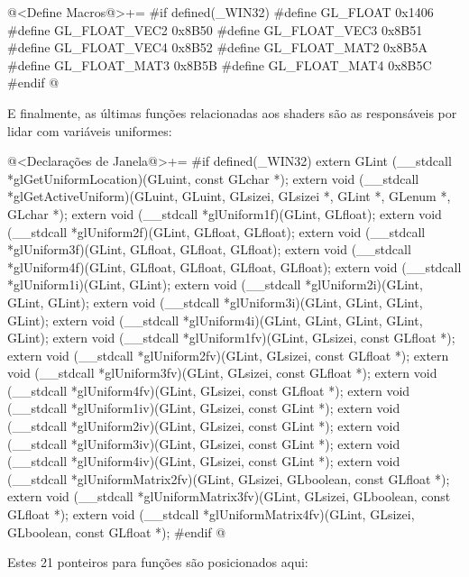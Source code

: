 \iniciocodigo
@<Define Macros@>+=
#if defined(_WIN32)
#define GL_FLOAT      0x1406
#define GL_FLOAT_VEC2 0x8B50
#define GL_FLOAT_VEC3 0x8B51
#define GL_FLOAT_VEC4 0x8B52
#define GL_FLOAT_MAT2 0x8B5A
#define GL_FLOAT_MAT3 0x8B5B
#define GL_FLOAT_MAT4 0x8B5C
#endif
@
\fimcodigo

E finalmente, as últimas funções relacionadas aos shaders são as
responsáveis por lidar com variáveis uniformes:

\iniciocodigo
@<Declarações de Janela@>+=
#if defined(_WIN32)
extern GLint (__stdcall *glGetUniformLocation)(GLuint, const GLchar *);
extern void (__stdcall *glGetActiveUniform)(GLuint, GLuint, GLsizei, GLsizei *,
                                            GLint *, GLenum *, GLchar *);
extern void (__stdcall *glUniform1f)(GLint, GLfloat);
extern void (__stdcall *glUniform2f)(GLint, GLfloat, GLfloat);
extern void (__stdcall *glUniform3f)(GLint, GLfloat, GLfloat, GLfloat);
extern void (__stdcall *glUniform4f)(GLint, GLfloat, GLfloat, GLfloat, GLfloat);
extern void (__stdcall *glUniform1i)(GLint, GLint);
extern void (__stdcall *glUniform2i)(GLint, GLint, GLint);
extern void (__stdcall *glUniform3i)(GLint, GLint, GLint, GLint);
extern void (__stdcall *glUniform4i)(GLint, GLint, GLint, GLint, GLint);
extern void (__stdcall *glUniform1fv)(GLint, GLsizei, const GLfloat *);
extern void (__stdcall *glUniform2fv)(GLint, GLsizei, const GLfloat *);
extern void (__stdcall *glUniform3fv)(GLint, GLsizei, const GLfloat *);
extern void (__stdcall *glUniform4fv)(GLint, GLsizei, const GLfloat *);
extern void (__stdcall *glUniform1iv)(GLint, GLsizei, const GLint *);
extern void (__stdcall *glUniform2iv)(GLint, GLsizei, const GLint *);
extern void (__stdcall *glUniform3iv)(GLint, GLsizei, const GLint *);
extern void (__stdcall *glUniform4iv)(GLint, GLsizei, const GLint *);
extern void (__stdcall *glUniformMatrix2fv)(GLint, GLsizei, GLboolean,
                                            const GLfloat *);
extern void (__stdcall *glUniformMatrix3fv)(GLint, GLsizei, GLboolean,
                                            const GLfloat *);
extern void (__stdcall *glUniformMatrix4fv)(GLint, GLsizei, GLboolean,
                                            const GLfloat *);
#endif
@
\fimcodigo

Estes 21 ponteiros para funções são posicionados aqui:

